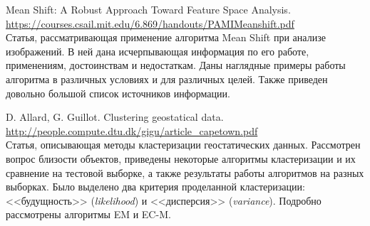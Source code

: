 Mean Shift: A Robust Approach Toward Feature Space Analysis.\\
\url{https://courses.csail.mit.edu/6.869/handouts/PAMIMeanshift.pdf}\\
Статья, рассматривающая применение алгоритма Mean Shift при анализе изображений. В ней дана
исчерпывающая информация по его работе, применениям, достоинствам и недостаткам. Даны наглядные
примеры работы алгоритма в различных условиях и для различных целей. Также приведен довольно
большой список источников информации.

D. Allard, G. Guillot. Clustering geostatical data.\\
\url{http://people.compute.dtu.dk/gigu/article_capetown.pdf}\\
Статья, описывающая методы кластеризации геостатических данных. Рассмотрен вопрос близости
объектов, приведены некоторые алгоритмы кластеризации и их сравнение на тестовой выборке,
а также результаты работы алгоритмов на разных выборках. Было выделено два критерия проделанной
кластеризации: <<будущность>> (\emph{likelihood}) и <<дисперсия>> (\emph{variance}). Подробно
рассмотрены алгоритмы EM и EC-M.

\newpage

